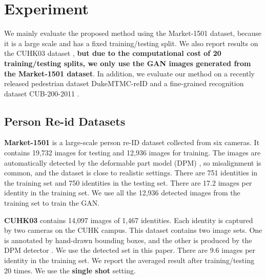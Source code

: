 \documentclass[10pt,twocolumn,letterpaper]{article}
\begin{document}
\section{Experiment} \label{sec:experiment}
We mainly evaluate the proposed method using the Market-1501 \cite{zheng2015scalable} dataset, because it is a large scale and has a fixed training/testing split. We also report results on the CUHK03 dataset \cite{li2014deepreid}, \textbf{but due to the computational cost of 20 training/testing splits, we only use the GAN images generated from the Market-1501 dataset}. In addition, we evaluate our method on a recently released pedestrian dataset DukeMTMC-reID \cite{ristani2016MTMC} and a fine-grained recognition dataset CUB-200-2011 \cite{WahCUB_200_2011}. 

\subsection{Person Re-id Datasets}
\textbf{Market-1501} is a large-scale person re-ID dataset collected from six cameras. It contains 19,732 images for testing and 12,936 images for training. The images are automatically detected by the deformable part model (DPM) \cite{felzenszwalb2010object}, so misalignment is common, and the dataset is close to realistic settings. There are 751 identities in the training set and 750 identities in the testing set. There are 17.2 images per identity in the training set. We use all the 12,936 detected images from the training set to train the GAN. 

\textbf{CUHK03} contains 14,097 images of 1,467 identities. Each identity is captured by two cameras on the CUHK campus. This dataset contains two image sets. One is annotated by hand-drawn bounding boxes, and the other is produced by the DPM detector \cite{felzenszwalb2010object}. We use the detected set in this paper. There are 9.6 images per identity in the training set. We report the averaged result after training/testing 20 times. We use the \textbf{single shot} setting.
\end{document}
